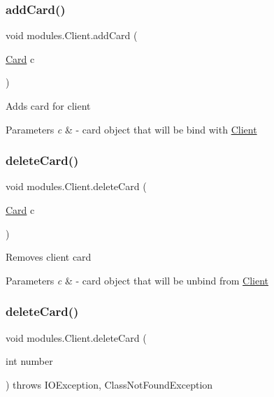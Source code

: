 \subsubsection{\texorpdfstring{add\+Card()}{addCard()}}
{\footnotesize\ttfamily void modules.\+Client.\+add\+Card (\begin{DoxyParamCaption}\item[{\mbox{\hyperlink{classmodules_1_1bank_1_1_card}{Card}}}]{c }\end{DoxyParamCaption})\hspace{0.3cm}{\ttfamily [inline]}}

Adds card for client 
\begin{DoxyParams}{Parameters}
{\em c} & -\/ card object that will be bind with \mbox{\hyperlink{classmodules_1_1_client}{Client}} \\
\hline
\end{DoxyParams}
\mbox{\label{classmodules_1_1_client_adc18605a931558c2483d48bf2cf36b0b}} 
\subsubsection{\texorpdfstring{delete\+Card()}{deleteCard()}\hspace{0.1cm}{\footnotesize\ttfamily [1/2]}}
{\footnotesize\ttfamily void modules.\+Client.\+delete\+Card (\begin{DoxyParamCaption}\item[{\mbox{\hyperlink{classmodules_1_1bank_1_1_card}{Card}}}]{c }\end{DoxyParamCaption})\hspace{0.3cm}{\ttfamily [inline]}}

Removes client card 
\begin{DoxyParams}{Parameters}
{\em c} & -\/ card object that will be unbind from \mbox{\hyperlink{classmodules_1_1_client}{Client}} \\
\hline
\end{DoxyParams}
\mbox{\label{classmodules_1_1_client_a4fd4fe0ecb40203d81addd411abd18df}} 
\subsubsection{\texorpdfstring{delete\+Card()}{deleteCard()}\hspace{0.1cm}{\footnotesize\ttfamily [2/2]}}
{\footnotesize\ttfamily void modules.\+Client.\+delete\+Card (\begin{DoxyParamCaption}\item[{int}]{number }\end{DoxyParamCaption}) throws I\+O\+Exception, Class\+Not\+Found\+Exception\hspace{0.3cm}{\ttfamily [inline]}}

